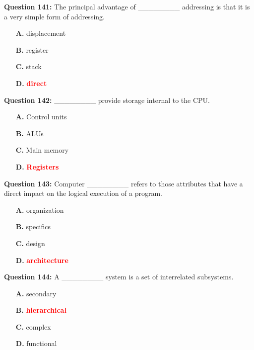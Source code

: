 \documentclass[12pt,a4paper]{article}
\begin{document}
\vspace{0.5cm}

\textbf{Question 141:} The principal advantage of ________ addressing is that it is a very simple form of addressing.

\begin{itemize}
    \item[\textbf{A.}] displacement
    \item[\textbf{B.}] register
    \item[\textbf{C.}] stack
    \item[\textbf{D.}] \textcolor{red}{\textbf{direct}}
\end{itemize}

\vspace{0.5cm}

\textbf{Question 142:} ________ provide storage internal to the CPU.

\begin{itemize}
    \item[\textbf{A.}] Control units
    \item[\textbf{B.}] ALUs
    \item[\textbf{C.}] Main memory
    \item[\textbf{D.}] \textcolor{red}{\textbf{Registers}}
\end{itemize}

\vspace{0.5cm}

\textbf{Question 143:} Computer ________ refers to those attributes that have a direct impact on the logical execution of a program.

\begin{itemize}
    \item[\textbf{A.}] organization
    \item[\textbf{B.}] specifics
    \item[\textbf{C.}] design
    \item[\textbf{D.}] \textcolor{red}{\textbf{architecture}}
\end{itemize}

\vspace{0.5cm}

\textbf{Question 144:} A ________ system is a set of interrelated subsystems.

\begin{itemize}
    \item[\textbf{A.}] secondary
    \item[\textbf{B.}] \textcolor{red}{\textbf{hierarchical}}
    \item[\textbf{C.}] complex
    \item[\textbf{D.}] functional
\end{itemize}
\end{document}
